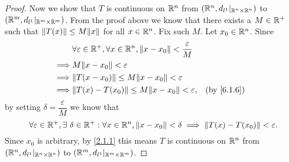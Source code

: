 \begin{proof}
  Now we show that \(T\) is continuous on \(\R^n\) from \((\R^n, d_{l^1}|_{\R^n \times \R^n})\) to \((\R^m, d_{l^1}|_{\R^m \times \R^m})\).
  From the proof above we know that there exists a \(M \in \R^+\) such that \(\norm*{T(x)} \leq M \norm*{x}\) for all \(x \in \R^n\).
  Fix such \(M\).
  Let \(x_0 \in \R^n\).
  Since
  \begin{align*}
             & \forall \varepsilon \in \R^+, \forall x \in \R^n, \norm*{x - x_0} < \dfrac{\varepsilon}{M}                               \\
    \implies & M \norm*{x - x_0} < \varepsilon                                                                                          \\
    \implies & \norm*{T(x - x_0)} \leq M \norm*{x - x_0} < \varepsilon                                                                  \\
    \implies & \norm*{T(x) - T(x_0)} \leq M \norm*{x - x_0} < \varepsilon,                                &  & \text{(by \cref{6.1.6})}
  \end{align*}
  by setting \(\delta = \dfrac{\varepsilon}{M}\) we know that
  \[
    \forall \varepsilon \in \R^+, \exists\ \delta \in \R^+ : \forall x \in \R^n, \norm*{x - x_0} < \delta \implies \norm*{T(x) - T(x_0)} < \varepsilon.
  \]
  Since \(x_0\) is arbitrary, by \cref{2.1.1} this means \(T\) is continuous on \(\R^n\) from \((\R^n, d_{l^1}|_{\R^n \times \R^n})\) to \((\R^m, d_{l^1}|_{\R^m \times \R^m})\).
\end{proof}
